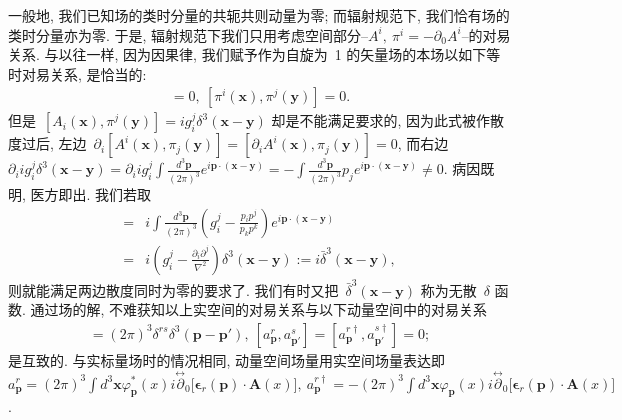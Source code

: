 一般地, 我们已知场的类时分量的共轭共则动量为零; 而辐射规范下, 我们恰有场的类时分量亦为零. 于是, 辐射规范下我们只用考虑空间部分--$A^i,~\pi^i=-\partial_0 A^i$--的对易关系. 与以往一样, 因为因果律, 我们赋予作为自旋为~1 的矢量场的本场以如下等时对易关系, 是恰当的:
\begin{align}
[A_i(\bm{x}),A_j(\bm{y})]=0,~[\pi^i(\bm{x}),\pi^j(\bm{y})]=0.
\end{align}
但是~$[A_i(\bm{x}),\pi^j(\bm{y})]=ig^j_i\delta^3(\bm{x}-\bm{y})$ 却是不能满足要求的, 因为此式被作散度过后, 左边~$\partial_i[A^i(\bm{x}),\pi_j(\bm{y})]=[\partial_iA^i(\bm{x}),\pi_j(\bm{y})]=0$, 而右边~$\partial_i ig^j_i\delta^3(\bm{x}-\bm{y})=\partial_iig^j_i\int\frac{d^3\bm{p}}{(2\pi)^3}e^{i\bm{p}\cdot(\bm{x}-\bm{y})}=-\int\frac{d^3\bm{p}}{(2\pi)^3}p_je^{i\bm{p}\cdot(\bm{x}-\bm{y})}\neq0$.
病因既明, 医方即出. 我们若取
\begin{align}
[A_i(\bm{x}),\pi^j(\bm{y})]=&i\int\frac{d^3\bm{p}}{(2\pi)^3}\left(g^j_i-\frac{p_ip^j}{p_k p^k}\right)e^{i\bm{p}\cdot(\bm{x}-\bm{y})}\nonumber\\
=&i\left(g^j_i-\frac{\partial_i\partial^j}{\nabla^2}\right)\delta^3(\bm{x}-\bm{y}):=i\bar{\delta}^3(\bm{x}-\bm{y}),
\end{align}
则就能满足两边散度同时为零的要求了. 我们有时又把~$\bar{\delta}^3(\bm{x}-\bm{y})$ 称为无散~$\delta$ 函数. 通过场的解, 不难获知以上实空间的对易关系与以下动量空间中的对易关系
\begin{align}
[a^r_{\bm{p}},a^{s\dag}_{\bm{p}'}]=(2\pi)^3\delta^{rs}\delta^3(\bm{p}-\bm{p}'),~[a^r_{\bm{p}},a^s_{\bm{p}'}]=[a^{r\dag}_{\bm{p}},a^{s\dag}_{\bm{p}'}]=0;
\end{align}
是互致的. 与实标量场时的情况相同, 动量空间场量用实空间场量表达即~$a_{\bm{p}}^r=(2\pi)^3\int d^3\bm{x}\varphi^*_{\bm{p}}(x)i\overset{\leftrightarrow}{\partial}_0\big[\bm{\epsilon}_r(\bm{p})\cdot\bm{A}(x)\big],~a^{r\dag}_{\bm{p}}=-(2\pi)^3\int d^3\bm{x}\varphi_{\bm{p}}(x)i\overset{\leftrightarrow}{\partial}_0\big[\bm{\epsilon}_r(\bm{p})\cdot\bm{A}(x)\big]$.


